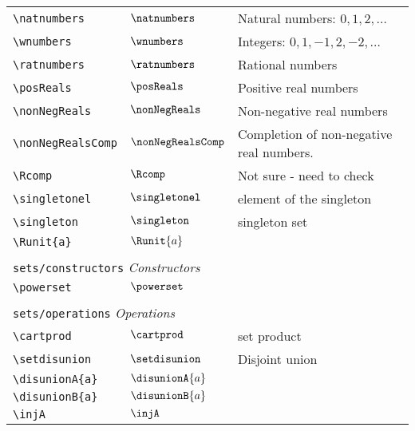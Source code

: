 \begin{longtable}{lll}
 {\color[rgb]{0.5,0.5,0.5}\texttt{\textbackslash natnumbers}} & $\natnumbers$ &  Natural numbers: $0, 1, 2, \dots$\\ 
 {\color[rgb]{0.5,0.5,0.5}\texttt{\textbackslash wnumbers}} & $\wnumbers$ &  Integers: $0, 1, -1, 2, -2, \dots$\\ 
 {\color[rgb]{0.5,0.5,0.5}\texttt{\textbackslash ratnumbers}} & $\ratnumbers$ &  Rational numbers\\ 
 {\color[rgb]{0.5,0.5,0.5}\texttt{\textbackslash posReals}} & $\posReals$ &  Positive real numbers\\ 
 {\color[rgb]{0.5,0.5,0.5}\texttt{\textbackslash nonNegReals}} & $\nonNegReals$ &  Non-negative real numbers\\ 
 {\color[rgb]{0.5,0.5,0.5}\texttt{\textbackslash nonNegRealsComp}} & $\nonNegRealsComp$ &  Completion of non-negative real numbers.\\ 
 {\color[rgb]{0.5,0.5,0.5}\texttt{\textbackslash Rcomp}} & $\Rcomp$ &  Not sure - need to check\\ 
 {\color[rgb]{0.5,0.5,0.5}\texttt{\textbackslash singletonel}} & $\singletonel$ &  element of the singleton\\ 
 {\color[rgb]{0.5,0.5,0.5}\texttt{\textbackslash singleton}} & $\singleton$ &  singleton set\\ 
 {\color[rgb]{0.5,0.5,0.5}\texttt{\textbackslash Runit\{a\}}} & $\Runit{a}$ & \\ 
  &  & \\ 
 \multicolumn{3}{l}{{\color[rgb]{0.5,0.5,0.5}\texttt{sets/constructors}} \emph{Constructors}}\\ 
 \hline
{\color[rgb]{0.5,0.5,0.5}\texttt{\textbackslash powerset}} & $\powerset$ & \\ 
  &  & \\ 
 \multicolumn{3}{l}{{\color[rgb]{0.5,0.5,0.5}\texttt{sets/operations}} \emph{Operations}}\\ 
 \hline
{\color[rgb]{0.5,0.5,0.5}\texttt{\textbackslash cartprod}} & $\cartprod$ &  set product\\ 
 {\color[rgb]{0.5,0.5,0.5}\texttt{\textbackslash setdisunion}} & $\setdisunion$ &  Disjoint union\\ 
 {\color[rgb]{0.5,0.5,0.5}\texttt{\textbackslash disunionA\{a\}}} & $\disunionA{a}$ & \\ 
 {\color[rgb]{0.5,0.5,0.5}\texttt{\textbackslash disunionB\{a\}}} & $\disunionB{a}$ & \\ 
 {\color[rgb]{0.5,0.5,0.5}\texttt{\textbackslash injA}} & $\injA$ & \\ 

\end{longtable}
